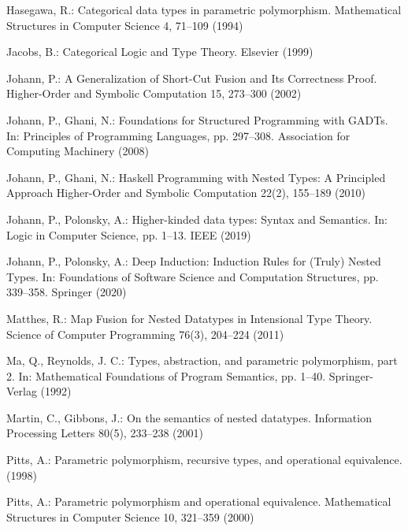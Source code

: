 \documentclass[runningheads]{llncs}
\begin{document}
\begin{thebibliography}{8}

 Hasegawa, R.: Categorical data types in parametric polymorphism. 
 Mathematical Structures in Computer Science  4,  71--109 (1994)

 Jacobs, B.: Categorical Logic and Type Theory. 
  Elsevier (1999)

 Johann, P.: A Generalization of Short-Cut Fusion and
  Its Correctness Proof.  Higher-Order and Symbolic Computation 15,
  273--300 (2002)


 Johann, P., Ghani, N.: Foundations for Structured
  Programming with GADTs.  In: Principles of Programming Languages,
  pp. 297--308. Association for Computing Machinery (2008)

 Johann, P., Ghani, N.: Haskell Programming with Nested
  Types: A Principled Approach Higher-Order and Symbolic Computation
  22(2), 155--189 (2010)

 Johann, P., Polonsky, A.: Higher-kinded data types:
  Syntax and Semantics. In: Logic in Computer Science, pp. 1--13. IEEE 
  (2019)

 Johann, P., Polonsky, A.: Deep Induction: Induction
  Rules for (Truly) Nested Types.  In: Foundations of Software Science
  and Computation Structures, pp. 339--358. Springer (2020)

 Matthes, R.: Map Fusion for Nested Datatypes in
  Intensional Type Theory. Science of Computer Programming 76(3),
  204--224 (2011)
    
 Ma, Q., Reynolds, J. C.: Types, abstraction, and
  parametric polymorphism, part 2.  In: Mathematical Foundations of
  Program Semantics, pp. 1--40. Springer-Verlag (1992)

 Martin, C., Gibbons, J.: On the semantics of nested
  datatypes.  Information Processing Letters 80(5), 233--238 (2001)


 Pitts, A.: Parametric polymorphism, recursive types,
  and operational equivalence.  (1998)

 Pitts, A.: Parametric polymorphism and operational equivalence.
  Mathematical Structures in Computer Science 10, 321--359 (2000)


\end{thebibliography}
\end{document}
